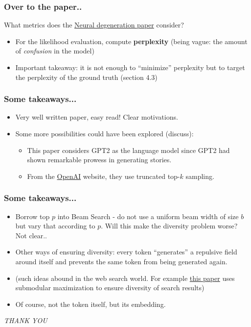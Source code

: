 \documentclass[11pt]{beamer}
\begin{document}
\begin{frame}
  \frametitle{Over to the paper..}
What metrics does the
 \href{https://arxiv.org/abs/1904.09751}{Neural degeneration paper} consider?
  \begin{itemize}
\item For the likelihood evaluation, compute {\bf perplexity} (being vague: the amount of {\em confusion} in the model)
\pause
\item Important takeaway: it is not enough to ``minimize'' perplexity but to target the perplexity of
the ground truth (section 4.3)
  \end{itemize}
\end{frame}

\begin{frame}
  \frametitle{Some takeaways...}
  \begin{itemize}
    \item Very well written paper, easy read! Clear motivations.
    \pause
    \item Some more possibilities could have been explored (discuss):
    \begin{itemize}
      \item This paper considers GPT2 as the language model since GPT2 had shown
      remarkable prowess in generating stories.
      \item From the \href{https://openai.com/blog/better-language-models/}{OpenAI} website, they use truncated top-$k$ sampling.
    \end{itemize}
  \end{itemize}
\end{frame}

\begin{frame}
  \frametitle{Some takeaways...}
    \begin{itemize}
      \item Borrow top $p$ into Beam Search - do not use a uniform beam width of size $b$ but
      vary that according to $p$. Will this make the diversity problem worse? Not clear..
      \pause
      \item Other ways of ensuring diversity: every token ``generates'' a repulsive field around itself
      and prevents the same token from being generated again.
      \pause
      \item (such ideas abound in the web search world. For example \href{https://arxiv.org/pdf/1203.6397.pdf}{this paper} uses submodular maximization to ensure diversity of search results)
      \item Of course, not the token itself, but its embedding.
    \end{itemize}
\end{frame}


\begin{frame}
\begin{center}
{\em THANK YOU}
\end{center}
\end{frame}
\end{document}
